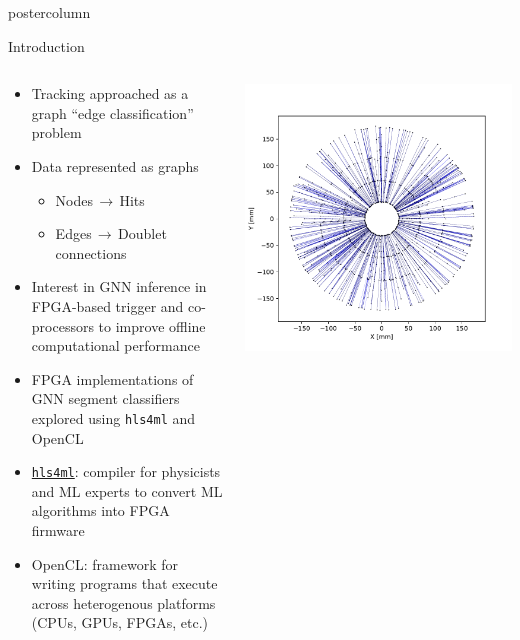 \documentclass[final,hyperref={pdfpagelabels=false}]{beamer}
\newcommand{\hlsfml}{{\texttt{hls4ml}}\xspace}
\begin{document}
\begin{frame}
\begin{columns}
\begin{column}{.33\textwidth}
\begin{beamercolorbox}[center,wd=\textwidth]{postercolumn}
\begin{minipage}[T]{.95\textwidth}
{            \begin{block}{Introduction}
              \vspace{-1.65cm}
              \begin{columns}
              \begin{column}{.49\textwidth}
                \begin{itemize}
                  \item Tracking approached as a graph ``edge classification'' problem
                  \item Data represented as graphs
                  \begin{itemize}
                    \item Nodes$\,\to\,$Hits
                    \item Edges$\,\to\,$Doublet connections
                  \end{itemize}
                  \item Interest in GNN inference in FPGA-based trigger and co-processors to improve offline computational performance
                  \item FPGA implementations of GNN segment classifiers explored using \hlsfml and OpenCL
                  \item \href{https://github.com/fastmachinelearning/hls4ml}{\hlsfml}: compiler for physicists and ML experts to convert ML algorithms into FPGA firmware
                  \item OpenCL: framework for writing programs that execute across heterogenous platforms (CPUs, GPUs, FPGAs, etc.)
                \end{itemize}
              \end{column}
              \begin{column}{.49\textwidth}
                \begin{center}
                  \includegraphics[width=0.85\linewidth]{figures/event000001000_section0_xy.pdf}

\end{center}
\end{column}
\end{columns}
\end{block}}
\end{minipage}
\end{beamercolorbox}
\end{column}
\end{columns}
\end{frame}
\end{document}
